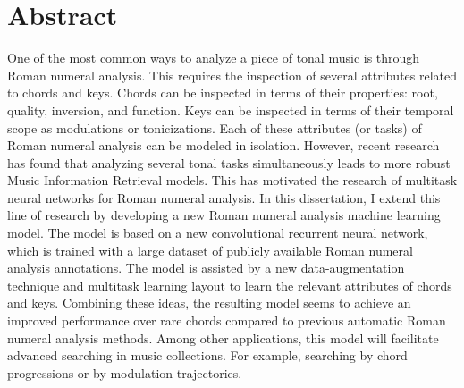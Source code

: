 \chapter*{Abstract}
\label{chap:abstract-en}

One of the most common ways to analyze a piece of tonal
music is through Roman numeral analysis. This requires the
inspection of several attributes related to chords and keys.
Chords can be inspected in terms of their properties: root,
quality, inversion, and function. Keys can be inspected in
terms of their temporal scope as modulations or
tonicizations. Each of these attributes (or tasks) of Roman
numeral analysis can be modeled in isolation. However,
recent research has found that analyzing several tonal tasks
simultaneously leads to more robust Music Information
Retrieval models. This has motivated the research of
multitask neural networks for Roman numeral analysis. In
this dissertation, I extend this line of research by
developing a new Roman numeral analysis machine learning
model. The model is based on a new convolutional recurrent
neural network, which is trained with a large dataset of
publicly available Roman numeral analysis annotations. The
model is assisted by a new data-augmentation technique and
multitask learning layout to learn the relevant attributes
of chords and keys. Combining these ideas, the resulting
model seems to achieve an improved performance over rare
chords compared to previous automatic Roman numeral analysis
methods. Among other applications, this model will
facilitate advanced searching in music collections. For
example, searching by chord progressions or by modulation
trajectories.
